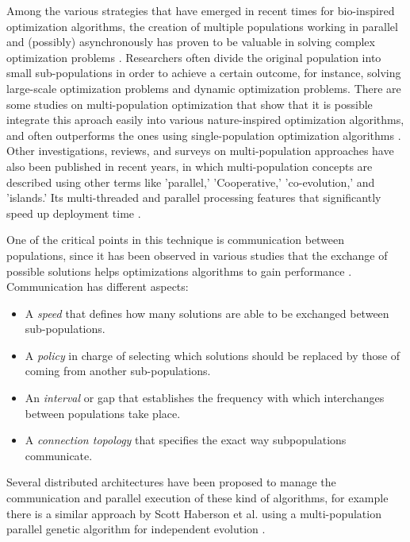 \documentclass[runningheads]{llncs}
\begin{document}
Among the various strategies that have emerged in recent times for bio-inspired
optimization algorithms, the creation of multiple populations working
in parallel and (possibly) asynchronously has proven to be valuable in 
solving complex optimization problems \cite{a1}.
Researchers often divide the original population into small sub-populations in order to 
achieve a certain outcome, for instance, solving large-scale optimization problems and dynamic
optimization problems. There are some studies on multi-population optimization that show
that it is possible integrate this aproach easily into various nature-inspired optimization algorithms,
and often outperforms the ones using single-population optimization algorithms \cite{b11} \cite{b12}.
Other investigations, reviews, and surveys on multi-population approaches have also
been published in recent years, in which multi-population concepts are described
using other terms like 'parallel,' 'Cooperative,' 'co-evolution,' and 'islands.'
Its multi-threaded and parallel processing features that significantly speed up
deployment time \cite{b13} \cite{b14}. %

One of the critical points in this technique is communication between
populations, since it has been observed in various studies that the
exchange of possible solutions helps optimizations algorithms to gain
performance \cite{a2}. Communication has different aspects:

\begin{itemize}
    \item A {\em speed} that defines how many solutions are able to be exchanged between sub-populations.
    \item A {\em policy} in charge of selecting which solutions should
      be replaced by those of coming from another sub-populations.
    \item An {\em interval} or gap that establishes the frequency with
      which interchanges between populations take place.
    \item A {\em connection topology} that specifies the exact way
      subpopulations communicate.
\end{itemize}

Several distributed architectures have been proposed to manage the communication
and parallel execution of these kind of algorithms, for example there is a
similar approach by Scott Haberson et al. using a multi-population parallel
genetic algorithm for independent evolution \cite{da1}. %
\end{document}
